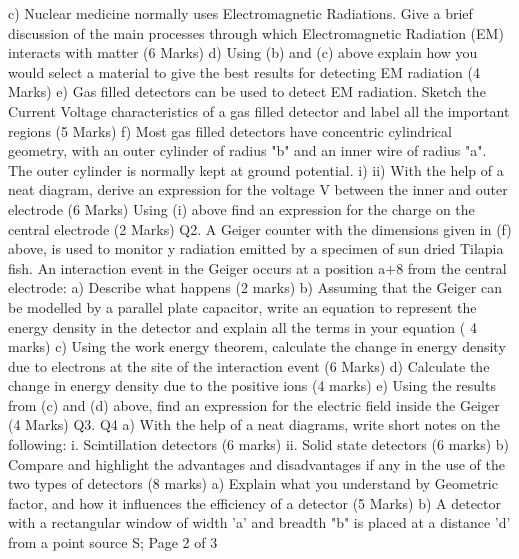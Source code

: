 \documentclass[12pt]{article}  %
\begin{document}
\begin{enumerate}
c) Nuclear medicine normally uses Electromagnetic Radiations. Give a brief discussion of the main processes through which Electromagnetic Radiation (EM) interacts with matter (6 Marks)
d) Using (b) and (c) above explain how you would select a material to give the best results for detecting EM radiation (4 Marks)
e) Gas filled detectors can be used to detect EM radiation. Sketch the Current Voltage characteristics of a gas filled detector and label all the important regions (5 Marks)
f) Most gas filled detectors have concentric cylindrical geometry, with an outer cylinder of radius "b" and an inner wire of radius "a". The outer cylinder is normally kept at ground potential.
i)
ii)
With the help of a neat diagram, derive an expression for the voltage V between the inner and outer electrode (6 Marks)
Using (i) above find an expression for the charge on the central electrode (2 Marks)
Q2. A Geiger counter with the dimensions given in (f) above, is used to monitor y radiation emitted by a specimen of sun dried Tilapia fish. An interaction event in the Geiger occurs at a position a+8 from the central electrode:
a) Describe what happens (2 marks)
b) Assuming that the Geiger can be modelled by a parallel plate capacitor, write an equation to represent the energy density in the detector and explain all the terms in your equation ( 4 marks)
c) Using the work energy theorem, calculate the change in energy density due to electrons at the site of the interaction event (6 Marks)
d) Calculate the change in energy density due to the positive ions (4 marks)
e) Using the results from (c) and (d) above, find an expression for the electric field inside the Geiger (4 Marks)
Q3.
Q4
a) With the help of a neat diagrams, write short notes on the following:
i.
Scintillation detectors (6 marks)
ii.
Solid state detectors (6 marks)
b) Compare and highlight the advantages and disadvantages if any in the use of the two types of detectors (8 marks)
a) Explain what you understand by Geometric factor, and how it influences the efficiency of a detector (5 Marks)
b) A detector with a rectangular window of width 'a' and breadth "b" is placed at a
distance 'd' from a point source S;
Page 2 of 3

﻿


\end{enumerate}
\end{document}
